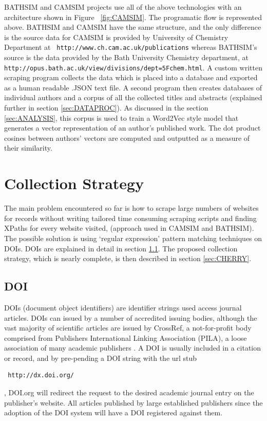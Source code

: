 \documentclass[11pt, oneside]{article}   	%
\begin{document}
BATHSIM and CAMSIM projects use all of the above technologies with an architecture shown in Figure ~\ref{fig:CAMSIM}. The programatic flow is represented above. BATHSIM and CAMSIM have the same structure, and the only difference is the source data for CAMSIM is provided by University of Chemistry Department at \texttt{ http://www.ch.cam.ac.uk/publications} whereas BATHSIM's source is the data provided by the Bath University Chemistry department, at \texttt{http://opus.bath.ac.uk/view/divisions/dept=5Fchem.html}. A custom written scraping program collects the data which is placed into a database and exported as a human readable .JSON text file. A second program then creates databases of individual authors and a corpus of all the collected titles and abstracts (explained further in section \ref{sec:DATAPROC}). As discussed in the section \ref{sec:ANALYSIS}, this corpus is used to train a Word2Vec style model that generates a vector representation of an author's published work. The dot product cosines between authors' vectors are computed and outputted as a measure of their similarity.
\section{Collection Strategy}
\label{sec:COLLECTIONSTRATEGY}
The main problem encountered so far is how to scrape large numbers of websites for records without writing tailored time consuming scraping scripts and finding XPaths for every website visited, (approach used in CAMSIM and BATHSIM). The possible solution is using `regular expression' pattern matching techniques on DOIs. DOIs are explained in detail in section \ref{sec:DOI}. The proposed collection strategy, which is nearly complete, is then described in section \ref{sec:CHERRY}.
\subsection{DOI}
\label{sec:DOI}
DOIs (document object identifiers) are identifier strings used access journal articles. DOIs can issued by a number of accredited issuing bodies, although the vast majority of scientific articles are issued by CrossRef, a not-for-profit body comprised from Publishers International Linking Association (PILA), a loose association of many academic publishers \cite{CROSSREF}. A DOI is usually included in a citation or record, and by pre-pending a DOI string with the url stub \begin{verbatim} http://dx.doi.org/ \end{verbatim}, DOI.org will redirect the request to the desired academic journal entry on the publisher's website. All articles published by large established publishers since the adoption of the DOI system will have a DOI registered against them.
\end{document}
